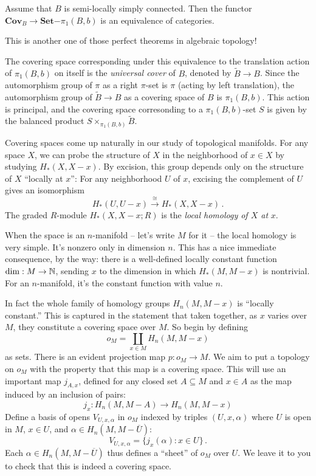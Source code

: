 \begin{theorem} Assume that $B$ is semi-locally simply connected.
Then the functor 
$\mathbf{Cov}_B\to\mathbf{Set}\mathrm{-}\pi_1(B,b)$ is an equivalence of 
categories. 
\end{theorem}

This is another one of those perfect theorems in algebraic topology! 

The covering space corresponding under this equivalence to the translation
action of $\pi_1(B,b)$ on itself is the {\em universal cover} of $B$,
denoted by $\widetilde B\to B$. Since the automorphism group of $\pi$ as
a right $\pi$-set is $\pi$ (acting by left translation), the automorphism
group of $\widetilde B\to B$ as a covering space of $B$ is $\pi_1(B,b)$. 
This action is principal, and the covering space corresonding to 
a $\pi_1(B,b)$-set $S$ is given by the balanced product 
$S\times_{\pi_1(B,b)}\widetilde B$. 

Covering spaces come up naturally in our study of topological manifolds. 
For any space $X$, we can probe the structure of $X$ in the neighborhood
of $x\in X$ by studying $H_*(X,X-x)$. By excision, this group depends only
on the structure of $X$ ``locally at $x$'': For any neighborhood $U$ of $x$,
excising the complement of $U$ gives an isomorphism
\[
H_*(U,U-x)\xrightarrow{\cong} H_*(X,X-x)\,.
\]
The graded $R$-module $H_*(X,X-x;R)$ is the {\em local homology of $X$ at}
$x$. 

When the space is an $n$-manifold -- let's write $M$ for it -- the local
homology is very simple. It's nonzero only in dimension $n$. This has a
nice immediate consequence, by the way: there is a well-defined 
locally constant function
$\dim:M\to\mathbb N$, sending $x$ to the dimension in which $H_*(M,M-x)$ is 
nontrivial. For an $n$-manifold, it's the constant function with value $n$.

In fact the whole family of homology groups $H_n(M,M-x)$ 
is ``locally constant.'' 
This is captured in the statement that taken together, as $x$ varies over
$M$, they constitute a covering space over $M$. So begin by defining
\[
o_M=\coprod_{x\in M}H_n(M,M-x)
\]
as sets.
There is an evident projection map $p:o_M\to M$. We aim to put a topology on
$o_M$ with the property that this map is a covering space. This will use
an important map $j_{A,x}$, defined for any closed set $A\subseteq M$ 
and $x\in A$ as the map induced by an inclusion of pairs: 
\[
j_x:H_n(M,M-A)\to H_n(M,M-x)
\]
Define a basis of opens $V_{U,x,\alpha}$ in $o_M$ 
indexed by triples $(U,x,\alpha)$ where $U$ is 
open in $M$, $x\in U$, and $\alpha\in H_n(M,M-\overline U)$:
\[
V_{U,x,\alpha}=\{j_x(\alpha):x\in U\}\,.
\]
Each $\alpha\in H_n(M,M-\overline U)$ thus defines a ``sheet'' of $o_M$
over $U$. We leave it to you to check that this is indeed a covering space. 

